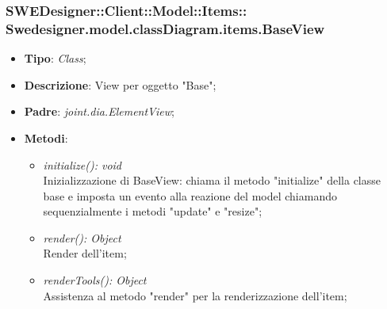 \documentclass[../DefinizioneDiProdotto.tex]{subfiles}
\begin{document}
			\subsubsection[Swedesigner.model.classDiagram.items.BaseView]{SWEDesigner::Client::Model::Items::\\Swedesigner.model.classDiagram.items.BaseView}
			\hypertarget{SWEDesigner::Client::Model::Items::Swedesigner.model.classDiagram.items.BaseView}{}
			\begin{itemize}
				\item \textbf{Tipo}: \emph{Class};
				\item \textbf{Descrizione}: View per oggetto "Base";
				\item \textbf{Padre}: \emph{joint.dia.ElementView};
				\item \textbf{Metodi}:
				\begin{itemize}
					\item \emph{initialize(): void}\\
					Inizializzazione di BaseView: chiama il metodo "initialize" della classe base e imposta un evento alla reazione del model chiamando sequenzialmente i metodi "update" e "resize";
					\item \emph{render(): Object}\\
					Render dell'item;
					\item \emph{renderTools(): Object}\\
					Assistenza al metodo "render" per la renderizzazione dell'item;
				\end{itemize}
			\end{itemize}
			
\end{document}
